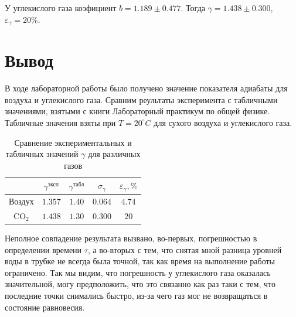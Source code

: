 \documentclass[a4paper,12pt]{article}
\begin{document}
У углекислого газа коэфициент $b = 1.189  \pm 0.477$. Тогда $\gamma = 1.438 \pm 0.300$, $\varepsilon_{\gamma} = 20 \%$.

\newpage
	\section{Вывод}
	
	В ходе лабораторной работы было получено значение показателя адиабаты для воздуха и углекислого газа. Сравним реультаты эксперимента с табличными значениями, взятыми с книги Лабораторный практикум по общей физике. Табличные значения взяты при $T = 20 ^\circ C$ для сухого воздуха и углекислого газа.


\begin{table}[h!]
    \centering
    \begin{tabular}{|c|c|c|c|c|}
        \hline
            & $\gamma^{\text{эксп}}$ & $\gamma^{\text{табл}}$ & $\sigma_{\gamma}$ & $\varepsilon_{\gamma}, \%$ \\ \hline
        Воздух & $1.357$ & $1.40$ & $0.064$  &  $4.74$  \\ \hline
        CO$_2$ & $1.438$ & $1.30$ & $0.300$ & $20$  \\ \hline
    \end{tabular}
    \caption{Сравнение экспериментальных и табличных значений $\gamma$ для различных газов}
\end{table}
    
 Неполное совпадение результата вызвано, во-первых, погрешностью в определении времени $\tau$, а во-вторых с тем, что снятая мной разница уровней воды в трубке не всегда была точной, так как время на выполнение работы ограничено. Так мы видим, что погрешность у углекислого газа оказалась значительной, могу предположить, что это связанно как раз таки с тем, что последние точки снимались быстро, из-за чего газ мог не возвращаться в состояние равновесия.
	
\end{document}
